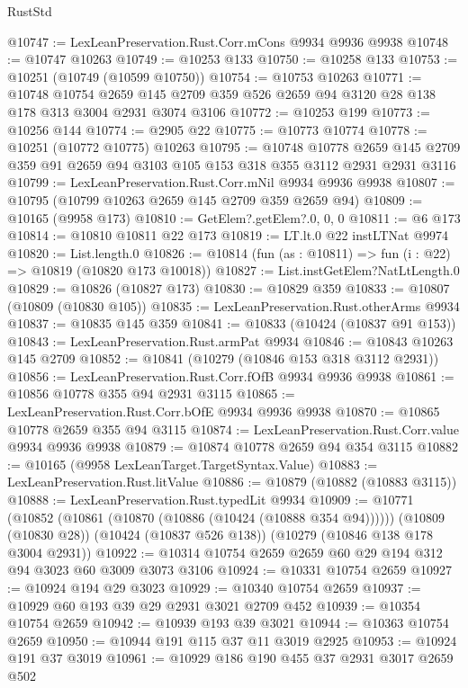 \begin{lexlean}{RustStd}
\begin{coremodule}
@10747 := LexLeanPreservation.Rust.Corr.mCons @9934 @9936 @9938
@10748 := @10747 @10263
@10749 := @10253 @133
@10750 := @10258 @133
@10753 := @10251 (@10749 (@10599 @10750))
@10754 := @10753 @10263
@10771 := @10748
    @10754
    @2659
    @145
    @2709
    @359
    @526
    @2659
    @94
    @3120
    @28
    @138
    @178
    @313
    @3004
    @2931
    @3074
    @3106
@10772 := @10253 @199
@10773 := @10256 @144
@10774 := @2905 @22
@10775 := @10773 @10774
@10778 := @10251 (@10772 @10775) @10263
@10795 := @10748
    @10778
    @2659
    @145
    @2709
    @359
    @91
    @2659
    @94
    @3103
    @105
    @153
    @318
    @355
    @3112
    @2931
    @2931
    @3116
@10799 := LexLeanPreservation.Rust.Corr.mNil @9934 @9936 @9938
@10807 := @10795 (@10799 @10263 @2659 @145 @2709 @359 @2659 @94)
@10809 := @10165 (@9958 @173)
@10810 := GetElem?.getElem?.{0, 0, 0}
@10811 := @6 @173
@10814 := @10810 @10811 @22 @173
@10819 := LT.lt.{0} @22 instLTNat @9974
@10820 := List.length.{0}
@10826 := @10814 (fun (as : @10811) => fun (i : @22) => @10819 (@10820 @173 @10018))
@10827 := List.instGetElem?NatLtLength.{0}
@10829 := @10826 (@10827 @173)
@10830 := @10829 @359
@10833 := @10807 (@10809 (@10830 @105))
@10835 := LexLeanPreservation.Rust.otherArms @9934
@10837 := @10835 @145 @359
@10841 := @10833 (@10424 (@10837 @91 @153))
@10843 := LexLeanPreservation.Rust.armPat @9934
@10846 := @10843 @10263 @145 @2709
@10852 := @10841 (@10279 (@10846 @153 @318 @3112 @2931))
@10856 := LexLeanPreservation.Rust.Corr.fOfB @9934 @9936 @9938
@10861 := @10856 @10778 @355 @94 @2931 @3115
@10865 := LexLeanPreservation.Rust.Corr.bOfE @9934 @9936 @9938
@10870 := @10865 @10778 @2659 @355 @94 @3115
@10874 := LexLeanPreservation.Rust.Corr.value @9934 @9936 @9938
@10879 := @10874 @10778 @2659 @94 @354 @3115
@10882 := @10165 (@9958 LexLeanTarget.TargetSyntax.Value)
@10883 := LexLeanPreservation.Rust.litValue
@10886 := @10879 (@10882 (@10883 @3115))
@10888 := LexLeanPreservation.Rust.typedLit @9934
@10909 := @10771
    (@10852 (@10861 (@10870 (@10886 (@10424 (@10888 @354 @94))))))
    (@10809 (@10830 @28))
    (@10424 (@10837 @526 @138))
    (@10279 (@10846 @138 @178 @3004 @2931))
@10922 := @10314 @10754 @2659 @2659 @60 @29 @194 @312 @94 @3023 @60 @3009 @3073 @3106
@10924 := @10331 @10754 @2659
@10927 := @10924 @194 @29 @3023
@10929 := @10340 @10754 @2659
@10937 := @10929 @60 @193 @39 @29 @2931 @3021 @2709 @452
@10939 := @10354 @10754 @2659
@10942 := @10939 @193 @39 @3021
@10944 := @10363 @10754 @2659
@10950 := @10944 @191 @115 @37 @11 @3019 @2925
@10953 := @10924 @191 @37 @3019
@10961 := @10929 @186 @190 @455 @37 @2931 @3017 @2659 @502

\end{coremodule}
\end{lexlean}

